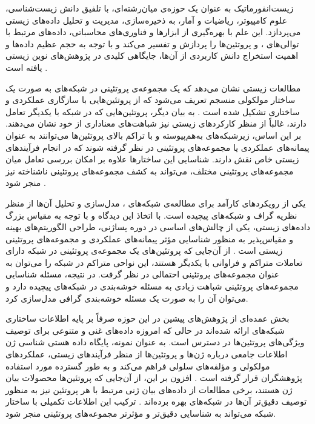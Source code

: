 زیست‌انفورماتیک به عنوان یک حوزه‌ی میان‌رشته‌ای، با تلفیق دانش زیست‌شناسی، علوم کامپیوتر، ریاضیات و آمار، به ذخیره‌سازی، مدیریت و تحلیل داده‌های زیستی می‌پردازد. این علم با بهره‌گیری از ابزارها و فناوری‌های محاسباتی، داده‌های مرتبط با توالی‌های ،  و پروتئین‌ها را پردازش و تفسیر می‌کند و با توجه به حجم عظیم داده‌ها و اهمیت استخراج دانش کاربردی از آن‌ها، جایگاهی کلیدی در پژوهش‌های نوین زیستی یافته است \cite{BioinformaticReview}.

مطالعات زیستی نشان می‌دهد که یک مجموعه‌ی پروتئینی در شبکه‌های  به صورت یک ساختار مولکولی منسجم تعریف می‌شود که از پروتئین‌هایی با سازگاری عملکردی و ساختاری تشکیل شده است \cite{survey}. به بیان دیگر، پروتئین‌هایی که در شبکه  با یکدیگر تعامل دارند، غالباً از منظر کارکردهای زیستی نیز شباهت‌های معناداری از خود نشان می‌دهند. بر این اساس، زیرشبکه‌های به‌هم‌پیوسته و با تراکم بالای پروتئین‌ها می‌توانند به عنوان پیمانه‌های عملکردی یا مجموعه‌های پروتئینی در نظر گرفته شوند که در انجام فرآیندهای زیستی خاص نقش دارند. شناسایی این ساختارها علاوه بر امکان بررسی تعامل میان مجموعه‌های پروتئینی مختلف، می‌تواند به کشف مجموعه‌های پروتئینی ناشناخته نیز منجر شود \cite{survey}.

یکی از رویکردهای کارآمد برای مطالعه‌ی شبکه‌های ، مدل‌سازی و تحلیل آن‌ها از منظر نظریه گراف و شبکه‌های پیچیده است. با اتخاذ این دیدگاه و با توجه به مقیاس بزرگ داده‌های زیستی، یکی از چالش‌های اساسی در دوره پسا‌ژنی، طراحی الگوریتم‌های بهینه و مقیاس‌پذیر به منظور شناسایی مؤثر پیمانه‌های عملکردی و مجموعه‌های پروتئینی زیستی است \cite{spectral}. از آن‌جایی که پروتئین‌های یک مجموعه‌ی پروتئینی در شبکه  دارای تعاملات متراکم و فراوانی با یکدیگر هستند، این نواحی متراکم در شبکه را می‌توان به عنوان مجموعه‌های پروتئینی احتمالی در نظر گرفت. در نتیجه، مسئله شناسایی مجموعه‌های پروتئینی شباهت زیادی به مسئله خوشه‌بندی در شبکه‌های پیچیده دارد \cite{computational} و می‌توان آن را به صورت یک مسئله خوشه‌بندی گرافی مدل‌سازی کرد.


بخش عمده‌ای از پژوهش‌های پیشین در این حوزه صرفاً بر پایه اطلاعات ساختاری شبکه‌های  ارائه شده‌اند در حالی که امروزه داده‌های غنی و متنوعی برای توصیف ویژگی‌های پروتئین‌ها در دسترس است. به عنوان نمونه، پایگاه داده هستی شناسی ژن اطلاعات جامعی درباره ژن‌ها و پروتئین‌ها از منظر فرآیندهای زیستی، عملکردهای مولکولی و مؤلفه‌های سلولی فراهم می‌کند و به طور گسترده مورد استفاده پژوهشگران قرار گرفته است \cite{gene}. افزون بر این، از آن‌جایی که پروتئین‌ها محصولات بیان ژن هستند، برخی مطالعات از داده‌های بیان ژنی مرتبط با هر پروتئین نیز به منظور توصیف دقیق‌تر آن‌ها در شبکه‌های  بهره برده‌اند \cite{integration}. ترکیب این اطلاعات تکمیلی با ساختار شبکه  می‌تواند به شناسایی دقیق‌تر و مؤثرتر مجموعه‌های پروتئینی منجر شود.

